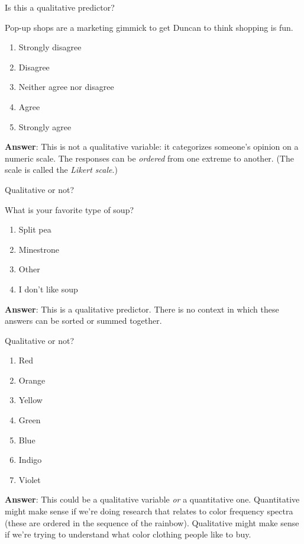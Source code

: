 \documentclass[aspectratio=169]{beamer}
\begin{document}
\begin{frame}{Is this a qualitative predictor?}

Pop-up shops are a marketing gimmick to get Duncan to think shopping is fun.

\begin{enumerate}
\item Strongly disagree
\item Disagree
\item Neither agree nor disagree
\item Agree
\item Strongly agree
\end{enumerate}

\vspace{5mm}

\textbf{Answer}: \pause  This is not a qualitative variable: it categorizes someone's opinion on a numeric scale.  The responses can be \textit{ordered} from one extreme to another.  (The scale is called the \textit{Likert scale}.)

\end{frame}

\begin{frame}{Qualitative or not?}

What is your favorite type of soup?
\begin{enumerate}
\item Split pea
\item Minestrone
\item Other
\item I don't like soup
\end{enumerate}

\vspace{5mm}

\textbf{Answer}: \pause This is a qualitative predictor.  There is no context in which these answers can be sorted or summed together.

\end{frame}

\begin{frame}{Qualitative or not?}

\begin{enumerate}
\item Red
\item Orange
\item Yellow
\item Green
\item Blue
\item Indigo
\item Violet
\end{enumerate}

\vspace{5mm}

\textbf{Answer}: \pause This could be a qualitative variable \textit{or } a quantitative one.  Quantitative might make sense if we're doing research that relates to color frequency spectra (these are ordered in the sequence of the rainbow).  Qualitative might make sense if we're trying to understand what color clothing people like to buy.

\end{frame}
\end{document}
